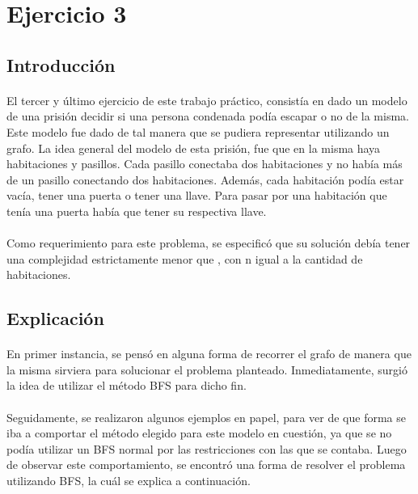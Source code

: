 \section{Ejercicio 3}

\subsection{Introducción}

\paragraph{}
El tercer y último ejercicio de este trabajo práctico, consistía en dado un modelo de una prisión decidir si una persona condenada podía escapar o no de la misma. Este modelo fue dado de tal manera que se pudiera representar utilizando un grafo. La idea general del modelo de esta prisión, fue que en la misma haya habitaciones y pasillos. Cada pasillo conectaba dos habitaciones y no había más de un pasillo conectando dos habitaciones. Además, cada habitación podía estar vacía, tener una puerta o tener una llave. Para pasar por una habitación que tenía una puerta había que tener su respectiva llave.

\paragraph{}
Como requerimiento para este problema, se especificó que su solución debía tener una complejidad estrictamente menor que , con n igual a la cantidad de habitaciones.


\subsection{Explicación}

\paragraph{}
En primer instancia, se pensó en alguna forma de recorrer el grafo de manera que la misma sirviera para solucionar el problema planteado. Inmediatamente, surgió la idea de utilizar el método BFS para dicho fin.

\paragraph{}
Seguidamente, se realizaron algunos ejemplos en papel, para ver de que forma se iba a comportar el método elegido para este modelo en cuestión, ya que se no podía utilizar un BFS normal por las restricciones con las que se contaba. Luego de observar este comportamiento, se encontró una forma de resolver el problema utilizando BFS, la cuál se explica a continuación.

